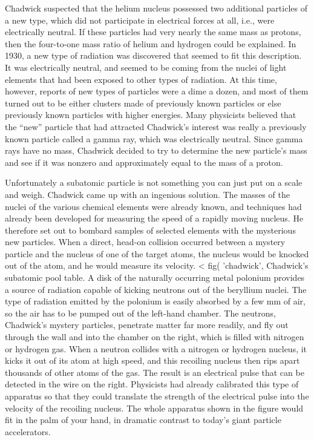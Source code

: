 Chadwick suspected that the helium nucleus possessed two
additional particles of a new type, which did not participate
in electrical forces at all, i.e., were electrically neutral.
If these particles had very nearly the same mass as protons,
then the four-to-one mass ratio of helium and hydrogen could
be explained. In 1930, a new type of radiation was
discovered that seemed to fit this description. It was
electrically neutral, and seemed to be coming from the
nuclei of light elements that had been exposed to other
types of radiation. At this time, however, reports of new
types of particles were a dime a dozen, and most of them
turned out to be either clusters made of previously known
particles or else previously known particles with higher
energies. Many physicists believed that the ``new'' particle
that had attracted Chadwick's interest was really a
previously known particle called a gamma
ray, which was electrically neutral. Since gamma rays have
no mass, Chadwick decided to try to determine the new
particle's mass and see if it was nonzero and approximately
equal to the mass of a proton.

Unfortunately a subatomic particle is not something you can
just put on a scale and weigh. Chadwick came up with an
ingenious solution. The masses of the nuclei of the various
chemical elements were already known, and techniques had
already been developed for measuring the speed of a rapidly
moving nucleus. He therefore set out to bombard samples of
selected elements with the mysterious new particles. When a
direct, head-on collision occurred between a mystery
particle and the nucleus of one of the target atoms, the
nucleus would be knocked out of the atom, and he would
measure its velocity.
<%
  fig(
    'chadwick',
      Chadwick's subatomic pool table. A disk of the naturally occurring metal polonium provides a source 
      of radiation capable of kicking neutrons out of the beryllium nuclei. The
      type of radiation emitted by the polonium is easily absorbed
      by a few mm of air, so the air has to be pumped out of the
      left-hand chamber. The neutrons, Chadwick's mystery particles, penetrate matter far more readily, and fly out through
      the wall and into the chamber on the right, which is filled with
      nitrogen or hydrogen gas. When a neutron collides with a
      nitrogen or hydrogen nucleus, it kicks it out of its atom at
      high speed, and this recoiling nucleus then rips apart thousands of other atoms of the gas. The result is an electrical
      pulse that can be detected in the wire on the right. Physicists
      had already calibrated this type of apparatus so that they
      could translate the strength of the electrical pulse into the
      velocity of the recoiling nucleus. The whole apparatus shown
      in the figure would fit in the palm of your hand, in dramatic
      contrast to today's giant particle accelerators.%
      
